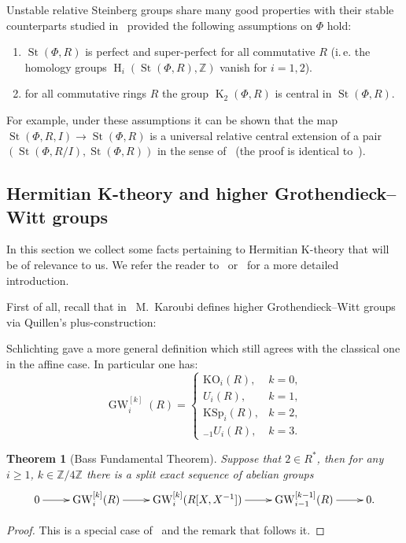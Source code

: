 \documentclass[oneside, 10pt]{amsart}
\newtheorem{theorem}{Theorem}
\theoremstyle{remark}
\theoremstyle{definition}
\DeclareMathOperator{\St}{St}
\DeclareMathOperator{\HH}{H}
\DeclareMathOperator{\K}{K}
\DeclareMathOperator{\GW}{GW}
\newcommand{\ZZ}{\mathbb{Z}}
\numberwithin{equation}{section}
\begin{document}
Unstable relative Steinberg groups share many good properties with their stable counterparts studied in~\cite{Lo78} provided the following assumptions on $\Phi$ hold: \begin{enumerate}
 \item $\St(\Phi, R)$ is perfect and super-perfect for all commutative $R$ (i.\,e. the homology groups $\HH_i(\St(\Phi, R), \ZZ)$ vanish for $i=1,2$).
 \item for all commutative rings $R$ the group $\K_2(\Phi, R)$ is central in $\St(\Phi, R)$.
\end{enumerate}
For example, under these assumptions it can be shown that the map $\St(\Phi, R, I) \to \St(\Phi, R)$ is a universal relative central extension of a pair $(\St(\Phi, R/I), \St(\Phi, R))$ in the sense of~\cite{Lo78} (the proof is identical to~\cite[Corollary~3]{S15}).

\subsection{Hermitian K-theory and higher Grothendieck--Witt groups}
In this section we collect some facts pertaining to Hermitian K-theory that will be of relevance to us. We refer the reader to~\cite[\S~2]{AF17} or~\cite[\S~2]{FRS12} for a more detailed introduction.

First of all, recall that in~\cite{Ka80} M.~Karoubi defines higher Grothendieck--Witt groups via Quillen's plus-construction:

Schlichting gave a more general definition which still agrees with the classical one in the affine case.
In particular one has:
\begin{equation}
 \GW_i^{[k]}(R) = \left\{\begin{array}{ll} \mathrm{KO}_i(R), & k = 0, \\ U_i(R), & k = 1, \\ \mathrm{KSp}_i(R), & k = 2, \\ {}_{-1}\!U_i(R), & k = 3. \end{array}\right.
\end{equation}


\begin{theorem}[Bass Fundamental Theorem]\label{bass-ft} Suppose that $2 \in R^*$, then for any $i\geq 1$, $k\in \ZZ/4\ZZ$ there is a split exact sequence of abelian groups
 \[ \xymatrix{ 0 \ar[r] & \GW_i^{[k]}(R) \ar[r] &  \GW_i^{[k]}(R[X, X^{-1}]) \ar[r]  & \GW_{i-1}^{[k-1]}(R) \ar[r] & 0.} \] \end{theorem}
\begin{proof} This is a special case of~\cite[Theorem~9.13]{Sch16} and the remark that follows it. \end{proof}
\end{document}
